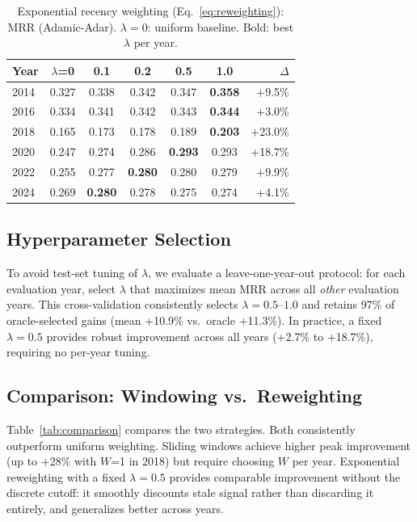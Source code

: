\documentclass[11pt]{article}
\begin{document}
\begin{table}[t]
\centering
\small
\caption{Exponential recency weighting (Eq.~\ref{eq:reweighting}): MRR (Adamic-Adar). $\lambda = 0$: uniform baseline. Bold: best $\lambda$ per year.}
\label{tab:reweighting}
\begin{tabular}{@{}l ccccc r@{}}
\toprule
\textbf{Year} & \textbf{$\lambda$=0} & \textbf{0.1} & \textbf{0.2} & \textbf{0.5} & \textbf{1.0} & \textbf{$\Delta$} \\
\midrule
2014 & 0.327 & 0.338 & 0.342 & 0.347 & \textbf{0.358} & +9.5\% \\
2016 & 0.334 & 0.341 & 0.342 & 0.343 & \textbf{0.344} & +3.0\% \\
2018 & 0.165 & 0.173 & 0.178 & 0.189 & \textbf{0.203} & +23.0\% \\
2020 & 0.247 & 0.274 & 0.286 & \textbf{0.293} & 0.293 & +18.7\% \\
2022 & 0.255 & 0.277 & \textbf{0.280} & 0.280 & 0.279 & +9.9\% \\
2024 & 0.269 & \textbf{0.280} & 0.278 & 0.275 & 0.274 & +4.1\% \\
\bottomrule
\end{tabular}
\end{table}

\subsection{Hyperparameter Selection}

To avoid test-set tuning of $\lambda$, we evaluate a leave-one-year-out protocol: for each evaluation year, select $\lambda$ that maximizes mean MRR across all \emph{other} evaluation years.
This cross-validation consistently selects $\lambda = 0.5$--$1.0$ and retains 97\% of oracle-selected gains (mean +10.9\% vs.\ oracle +11.3\%).
In practice, a fixed $\lambda = 0.5$ provides robust improvement across all years (+2.7\% to +18.7\%), requiring no per-year tuning.

\subsection{Comparison: Windowing vs.\ Reweighting}

Table~\ref{tab:comparison} compares the two strategies.
Both consistently outperform uniform weighting.
Sliding windows achieve higher peak improvement (up to +28\% with $W$=1 in 2018) but require choosing $W$ per year.
Exponential reweighting with a fixed $\lambda = 0.5$ provides comparable improvement without the discrete cutoff: it smoothly discounts stale signal rather than discarding it entirely, and generalizes better across years.
\end{document}
